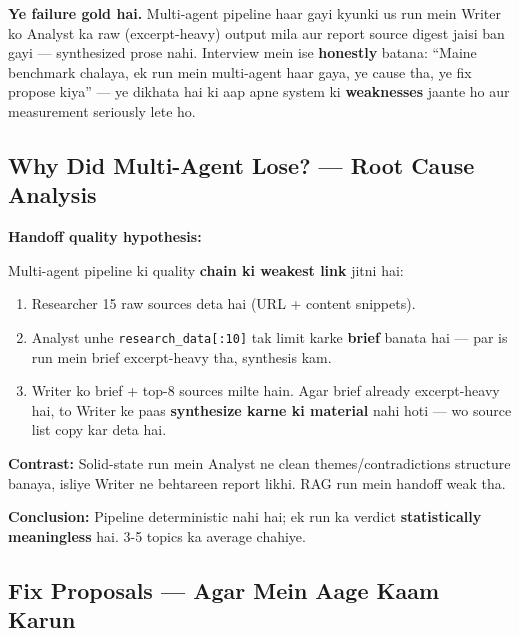\begin{warningbox}
\textbf{Ye failure gold hai.} Multi-agent pipeline haar gayi kyunki us run mein Writer ko Analyst ka raw (excerpt-heavy) output mila aur report source digest jaisi ban gayi --- synthesized prose nahi. Interview mein ise \textbf{honestly} batana: ``Maine benchmark chalaya, ek run mein multi-agent haar gaya, ye cause tha, ye fix propose kiya'' --- ye dikhata hai ki aap apne system ki \textbf{weaknesses} jaante ho aur measurement seriously lete ho.
\end{warningbox}

\subsection{Why Did Multi-Agent Lose? --- Root Cause Analysis}

\begin{conceptbox}
\textbf{Handoff quality hypothesis:}

Multi-agent pipeline ki quality \textbf{chain ki weakest link} jitni hai:
\begin{enumerate}[label=\arabic*.]
\item Researcher 15 raw sources deta hai (URL + content snippets).
\item Analyst unhe \texttt{research\_data[:10]} tak limit karke \textbf{brief} banata hai --- par is run mein brief excerpt-heavy tha, synthesis kam.
\item Writer ko brief + top-8 sources milte hain. Agar brief already excerpt-heavy hai, to Writer ke paas \textbf{synthesize karne ki material} nahi hoti --- wo source list copy kar deta hai.
\end{enumerate}

\textbf{Contrast:} Solid-state run mein Analyst ne clean themes/contradictions structure banaya, isliye Writer ne behtareen report likhi. RAG run mein handoff weak tha.

\textbf{Conclusion:} Pipeline deterministic nahi hai; ek run ka verdict \textbf{statistically meaningless} hai. 3-5 topics ka average chahiye.
\end{conceptbox}

\subsection{Fix Proposals --- Agar Mein Aage Kaam Karun}


